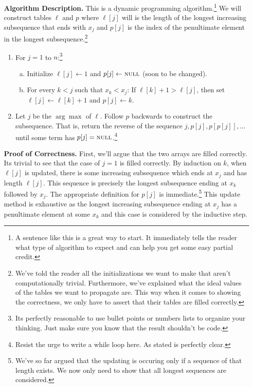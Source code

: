 \documentclass[11pt]{article}
\theoremstyle{plain}
\theoremstyle{definition}
\newcommand{\short}[1]{\mbox{\sc #1}}
\newcommand{\nil}{\short{null}}
\numberwithin{equation}{section}
\numberwithin{figure}{section}
\begin{document}
\noindent \textbf{Algorithm Description.} This is a dynamic programming algorithm.\footnote{A sentence like this is a great way to start. It immediately tells the reader what type of algorithm to expect and can help you get some easy partial credit.} We will construct tables $\ell$ and $p$ where $\ell[j]$ will is the length of the longest increasing subsequence that ends with $x_j$ and $p[j]$ is the index of the penultimate element in the longest subsequence.\footnote{We've told the reader all the initializations we want to make that aren't computationally trivial. Furthermore, we've explained what the ideal values of the tables we want to propagate are. This way when it comes to showing the correctness, we only have to assert that their tables are filled correctly.} 

\begin{enumerate}
\item For $j = 1$ to $n$:\footnote{Its perfectly reasonable to use bullet points or numbers lists to organize your thinking. Just make sure you know that the result shouldn't be code.}
\begin{enumerate}[(a)]
\item Initialize $\ell[j] \leftarrow 1$ and $p[j] \leftarrow \nil$ (soon to be changed).
\item For every $k < j$ such that $x_k < x_j$: If $\ell[k] + 1 > \ell[j]$, then set $\ell[j] \leftarrow \ell[k] + 1$ and $p[j] \leftarrow k$.
\end{enumerate}
\item Let $j$ be the $\arg \max$ of $\ell$. Follow $p$ backwards to construct the subsequence. That is, return the reverse of the sequence $j, p[j], p[p[j]], \ldots$ until some term has $p[j] = \nil$.\footnote{Resist the urge to write a while loop here. As stated is perfectly clear.}
\end{enumerate}

\noindent \textbf{Proof of Correctness.} First, we'll argue that the two arrays are filled correctly. Its trivial to see that the case of $j = 1$ is filled correctly. By induction on $k$, when $\ell[j]$ is updated, there is some increasing subsequence which ends at $x_j$ and has length $\ell[j]$. This sequence is precisely the longest subsequence ending at $x_k$ followed by $x_j$. The appropriate definition for $p[j]$ is immediate.\footnote{We've so far argued that the updating is occuring only if a sequence of that length exists. We now only need to show that all longest sequences are considered.} This update method is exhaustive as the longest increasing subsequence ending at $x_j$ has a penultimate element at some $x_k$ and this case is considered by the inductive step. \\
\end{document}
